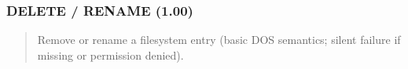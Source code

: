 \documentclass[letterpaper,10pt,english]{sphinxmanual}
\begin{document}
\subsubsection{DELETE / RENAME (1.00)}
\label{\detokenize{ppl:delete-rename-1-00}}\begin{quote}

\sphinxAtStartPar
{}
\begin{description}
\sphinxAtStartPar
Remove or rename a filesystem entry (basic DOS semantics; silent failure if missing or permission denied).

\end{description}
\end{quote}
\end{document}
